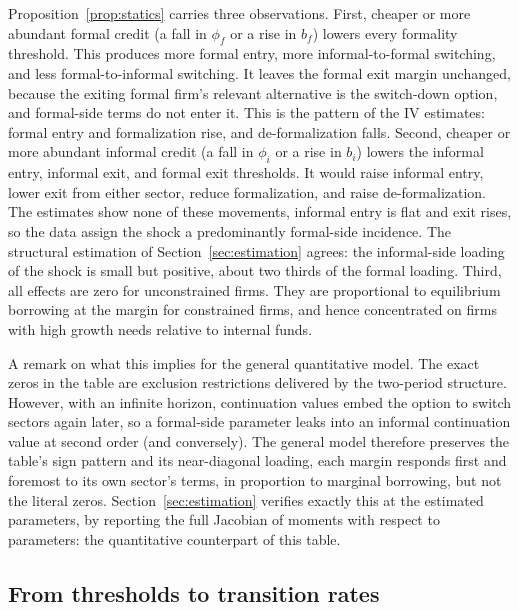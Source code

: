 \documentclass[12pt]{article}
\begin{document}
Proposition~\ref{prop:statics} carries three observations. First, cheaper or more abundant formal credit (a fall in $\phi_{f}$ or a rise in $b_{f}$) lowers every formality threshold. This produces more formal entry, more informal-to-formal switching, and less formal-to-informal switching. It leaves the formal exit margin unchanged, because the exiting formal firm's relevant alternative is the switch-down option, and formal-side terms do not enter it. This is the pattern of the IV estimates: formal entry and formalization rise, and de-formalization falls. Second, cheaper or more abundant informal credit (a fall in $\phi_{i}$ or a rise in $b_{i}$) lowers the informal entry, informal exit, and formal exit thresholds. It would raise informal entry, lower exit from either sector, reduce formalization, and raise de-formalization. The estimates show none of these movements, informal entry is flat and exit rises, so the data assign the shock a predominantly formal-side incidence. The structural estimation of Section~\ref{sec:estimation} agrees: the informal-side loading of the shock is small but positive, about two thirds of the formal loading. Third, all effects are zero for unconstrained firms. They are proportional to equilibrium borrowing at the margin for constrained firms, and hence concentrated on firms with high growth needs relative to internal funds.
 
A remark on what this implies for the general quantitative model. The exact zeros in the table are exclusion restrictions delivered by the two-period structure. However, with an infinite horizon, continuation values embed the option to switch sectors again later, so a formal-side parameter leaks into an informal continuation value at second order (and conversely). The general model therefore preserves the table's sign pattern and its near-diagonal loading, each margin responds first and foremost to its own sector's terms, in proportion to marginal borrowing, but not the literal zeros. Section~\ref{sec:estimation} verifies exactly this at the estimated parameters, by reporting the full Jacobian of moments with respect to parameters: the quantitative counterpart of this table.
 
\subsection{From thresholds to transition rates}
\label{sec:toy-transitions}
\end{document}

